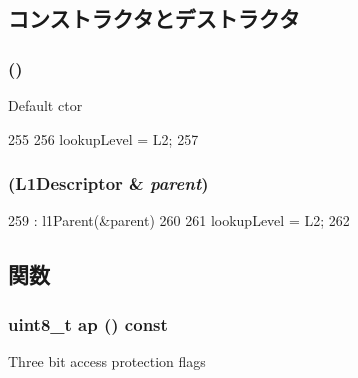 \subsection{コンストラクタとデストラクタ}
\hypertarget{classArmISA_1_1TableWalker_1_1L2Descriptor_a9d780c55ac9abb29760291c822a3673c}{
\subsubsection[{L2Descriptor}]{ ()}}
\label{classArmISA_1_1TableWalker_1_1L2Descriptor_a9d780c55ac9abb29760291c822a3673c}
Default ctor 


\begin{DoxyCode}
255         {
256             lookupLevel = L2;
257         }
\end{DoxyCode}
\hypertarget{classArmISA_1_1TableWalker_1_1L2Descriptor_a64a173da628a256ff6b12362d2071fe8}{
\subsubsection[{L2Descriptor}]{ ({\bf L1Descriptor} \& {\em parent})}}
\label{classArmISA_1_1TableWalker_1_1L2Descriptor_a64a173da628a256ff6b12362d2071fe8}



\begin{DoxyCode}
259                                            : l1Parent(&parent)
260         {
261             lookupLevel = L2;
262         }
\end{DoxyCode}


\subsection{関数}
\hypertarget{classArmISA_1_1TableWalker_1_1L2Descriptor_a4fc87654615da601dbbc3cb6dd1046ee}{
\subsubsection[{ap}]{\setlength{\rightskip}{0pt plus 5cm}uint8\_\-t ap () const}}
\label{classArmISA_1_1TableWalker_1_1L2Descriptor_a4fc87654615da601dbbc3cb6dd1046ee}
Three bit access protection flags 

